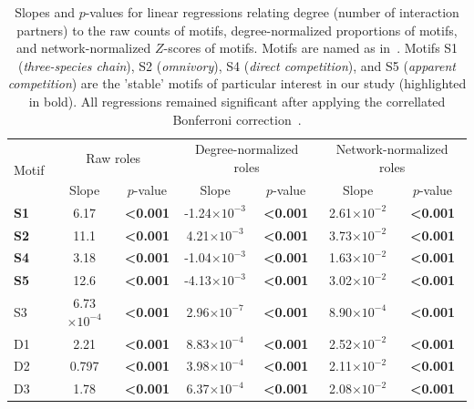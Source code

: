 \documentclass[12pt]{article}
\begin{document}
    \begin{table}[h!]
        \caption{Slopes and $p$-values for linear regressions relating degree (number of interaction partners) to the raw counts of motifs, degree-normalized proportions of motifs, and network-normalized $Z$-scores of motifs. Motifs are named as in~\citet{Stouffer2007}. Motifs S1 (\emph{three-species chain}), S2 (\emph{omnivory}), S4 (\emph{direct competition}), and S5 (\emph{apparent competition}) are the 'stable' motifs of particular interest in our study (highlighted in bold). All regressions remained significant after applying the correllated Bonferroni correction~\citep{Drezner2016}.}
        \label{degree_lms}
        \begin{tabular}{l | c c c c c c }
        \multirow{2}{*}{Motif} & \multicolumn{2}{c}{Raw roles} & \multicolumn{2}{c}{Degree-normalized roles} & \multicolumn{2}{c}{Network-normalized roles} \\
        & Slope & $p$-value & Slope & $p$-value & Slope & $p$-value \\
        \hline
        \textbf{S1}	&	6.17	&	\textbf{\textless0.001}	& -1.24$\times10^{-3}$	&	\textbf{\textless0.001}	&	2.61$\times10^{-2}$	&	\textbf{\textless0.001}	\\
        \textbf{S2}	&	11.1	&	\textbf{\textless0.001}	& 4.21$\times10^{-3}$	&	\textbf{\textless0.001}	&	3.73$\times10^{-2}$	&	\textbf{\textless0.001}	\\
        \textbf{S4}	&	3.18	&	\textbf{\textless0.001}	& -1.04$\times10^{-3}$	&	\textbf{\textless0.001}	&	1.63$\times10^{-2}$	&	\textbf{\textless0.001}	\\
        \textbf{S5}	&	12.6	&	\textbf{\textless0.001}	& -4.13$\times10^{-3}$	&	\textbf{\textless0.001}	&	3.02$\times10^{-2}$	&	\textbf{\textless0.001}	\\
        \hline
        S3	&	6.73$\times10^{-4}$	&	\textbf{\textless0.001}	&	2.96$\times10^{-7}$	&	\textbf{\textless0.001}	&	8.90$\times10^{-4}$	&	\textbf{\textless0.001}	\\
        D1	&	2.21	&	\textbf{\textless0.001}	&	8.83$\times10^{-4}$	&	\textbf{\textless0.001}	&	2.52$\times10^{-2}$	&	\textbf{\textless0.001}	\\
        D2	&	0.797	&	\textbf{\textless0.001}	&	3.98$\times10^{-4}$	&	\textbf{\textless0.001}	&	2.11$\times10^{-2}$
        	&	\textbf{\textless0.001}	\\
        D3	&	1.78	&	\textbf{\textless0.001}	&	6.37$\times10^{-4}$	&	\textbf{\textless0.001}	&	2.08$\times10^{-2}$	&	\textbf{\textless0.001}	\\

\end{tabular}
\end{table}
\end{document}
